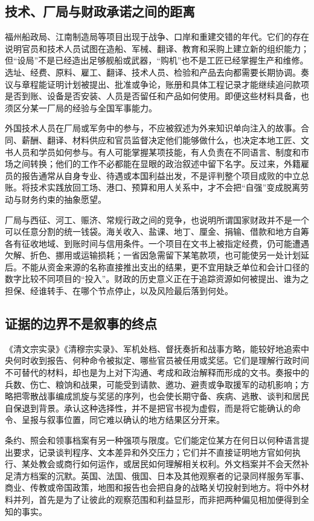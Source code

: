 \subsection{技术、厂局与财政承诺之间的距离}

福州船政局、江南制造局等项目出现于战争、口岸和重建交错的年代。它们的存在说明官员和技术人员试图在造船、军械、翻译、教育和采购上建立新的组织能力；但“设局”不是已经造出足够舰船或武器，“购机”也不是工匠已经掌握生产和维修。选址、经费、原料、雇工、翻译、技术人员、检验和产品去向都需要长期协调。奏议与章程能证明计划被提出、批准或争论，账册和具体工程记录才能继续追问款项是否到账、设备是否安装、人员是否留任和产品如何使用。即便这些材料具备，也须区分某一厂局的经验与全国军事能力。

外国技术人员在厂局或军务中的参与，不应被叙述为外来知识单向注入的故事。合同、薪酬、翻译、材料供应和官员监督决定他们能够做什么，也决定本地工匠、文书人员和学员如何参与。有人可能掌握某项技能，有人负责在不同语言、制度和市场之间转换；他们的工作不必都能在显眼的政治叙述中留下名字。反过来，外籍雇员的报告通常从自身专业、待遇或本国利益出发，不是评判整个项目成败的中立总账。将技术实践放回工场、港口、预算和用人关系中，才不会把“自强”变成脱离劳动与财务约束的抽象愿望。

厂局与西征、河工、赈济、常规行政之间的竞争，也说明所谓国家财政并不是一个可以任意分割的统一钱袋。海关收入、盐课、地丁、厘金、捐输、借款和地方自筹各有征收地域、到账时间与信用条件。一个项目在文书上被指定经费，仍可能遭遇欠解、折色、挪用或运输损耗；一省因急需留下某笔款项，也可能使另一处计划延后。不能从资金来源的名称直接推出支出的结果，更不宜用缺乏单位和会计口径的数字比较不同项目的“投入”。财政的历史意义正在于追踪资源如何被提出、谁为之担保、经谁转手、在哪个节点停止，以及风险最后落到何处。

\subsection{证据的边界不是叙事的终点}

《清文宗实录》《清穆宗实录》、军机处档、督抚奏折和战事方略，能较好地追索中央何时收到报告、何种命令被拟定、哪些官员被任用或奖惩。它们是理解行政时间不可替代的材料，却也是为上对下沟通、考成和政治解释而形成的文书。奏报中的兵数、伤亡、粮饷和战果，可能受到请款、邀功、避责或争取援军的动机影响；方略把零散战事编成凯旋与奖惩的序列，也会使长期守备、疾病、逃散、谈判和居民自保退到背景。承认这种选择性，并不是把官书视为虚假，而是将它能确认的命令、呈报与叙事位置，同它难以确认的地方结果区分开来。

条约、照会和领事档案有另一种强项与限度。它们能定位某方在何日以何种语言提出要求，记录谈判程序、文本差异和外交压力；它们并不直接证明地方官如何执行、某处教会或商行如何运作，或居民如何理解相关权利。外文档案并不会天然补足清方档案的沉默。英国、法国、俄国、日本及其他观察者的记录同样服务军事、商业、传教或帝国政策，地图和报告也会把自身的战略关切投射到地方。将中外材料并列，首先是为了让彼此的观察范围和利益显形，而非把两种偏见相加便得到全知的事实。

